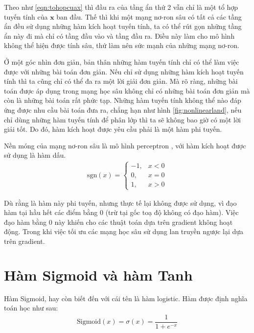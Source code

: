 Theo như \ref{eqn:tohopcuax} thì đầu ra của tầng ẩn thứ 2 vẫn chỉ là một tổ hợp tuyến tính của $\mathbf{x}$ ban đầu.
Thế thì khi một mạng nơ-ron sâu có tất cả các tầng ẩn đều sử dụng những hàm kích hoạt tuyến tính, ta có thể rút gọn những tầng ẩn này đi mà chỉ có tầng đầu vào và tầng đầu ra.
Điều này làm cho mô hình không thể hiện được tính sâu, thứ làm nên sức mạnh của những mạng nơ-ron.
\vspace{5pt}

Ở một góc nhìn đơn giản, bản thân những hàm tuyến tính chỉ có thể làm việc được với những bài toán đơn giản.
Nếu chỉ sử dụng những hàm kích hoạt tuyến tính thì ta cũng chỉ có thể đa ra một lời giải đơn giản.
Mà rõ ràng, những bài toán được áp dụng trong mạng học sâu không chỉ có những bài toán đơn giản mà còn là những bài toán rất phức tạp.
Những hàm tuyến tính không thể nào đáp ứng được nhu cầu bài toán đưa ra, chẳng hạn như hình \ref{fig:nonlinearland}, nếu chỉ dùng những hàm tuyến tính để phân lớp thì ta sẽ không bao giờ có một lời giải tốt.
Do đó, hàm kích hoạt được yêu cầu phải là một hàm phi tuyến.
\vspace{5pt}

Nền móng của mạng nơ-ron sâu là mô hình perceptron \cite{luocsudlvuhuutiep}, với hàm kích hoạt được sử dụng là hàm dấu.
\begin{align}
    \text{sgn}(x) = \begin{cases}-1, &x < 0\\ 0, &x = 0\\ 1, &x > 0\end{cases}
\end{align}

Dù rằng là hàm này phi tuyến, nhưng thực tế lại không được sử dụng, vì đạo hàm tại hầu hết các điểm bằng 0 (trừ tại gốc toạ độ không có đạo hàm).
Việc đạo hàm bằng 0 này khiến cho các thuật toán dựa trên gradient không hoạt động.
Trong khi việc tối ưu các mạng học sâu sử dụng lan truyền ngược lại dựa trên gradient.

\section{Hàm Sigmoid và hàm Tanh}\label{sec:hamsigmoidvahamtanh}

Hàm Sigmoid, hay còn biết đến với cái tên là hàm logistic. Hàm được định nghĩa toán học như sau:
\begin{align}
    \text{Sigmoid}(x) = \sigma(x) = \dfrac{1}{1 + e^{-x}}
\end{align}

